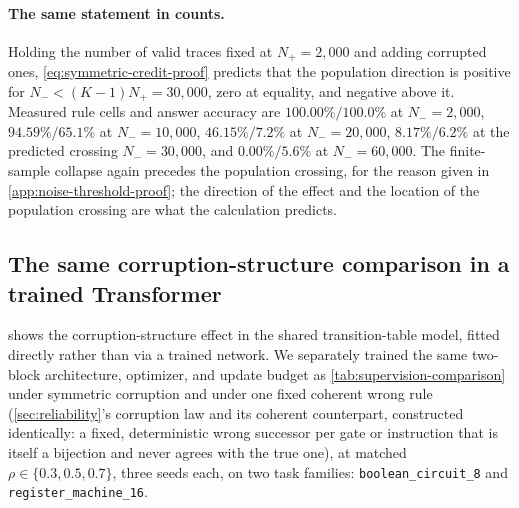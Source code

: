 \paragraph{The same statement in counts.}
Holding the number of valid traces fixed at $N_+=2{,}000$ and adding corrupted
ones, \cref{eq:symmetric-credit-proof} predicts that the population direction
is positive for $N_-<(K-1)N_+=30{,}000$, zero at equality, and negative above it.  Measured rule cells and answer accuracy
are $100.00\%/100.0\%$ at $N_-=2{,}000$, $94.59\%/65.1\%$ at $N_-=10{,}000$,
$46.15\%/7.2\%$ at $N_-=20{,}000$, $8.17\%/6.2\%$ at the predicted crossing
$N_-=30{,}000$, and $0.00\%/5.6\%$ at $N_-=60{,}000$.  The finite-sample
collapse again precedes the population crossing, for the reason given in
\cref{app:noise-threshold-proof}; the direction of the effect and the location
of the population crossing are what the calculation predicts.

\subsection{The same corruption-structure comparison in a trained Transformer}
\label{app:trained-corruption-structure}

 shows the corruption-structure effect in the
shared transition-table model, fitted directly rather than via a trained
network. We separately trained the same two-block architecture,
optimizer, and update budget as \cref{tab:supervision-comparison} under
symmetric corruption and under one fixed coherent wrong rule
(\cref{sec:reliability}'s corruption law and its coherent counterpart,
constructed identically: a fixed, deterministic wrong successor per gate
or instruction that is itself a bijection and never agrees with the true
one), at matched $\rho\in\{0.3,0.5,0.7\}$, three seeds each, on two task
families: \texttt{boolean\_circuit\_8} and \texttt{register\_machine\_16}.

